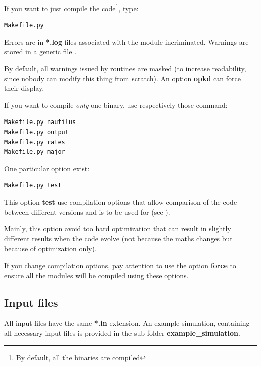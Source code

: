 \documentclass[english,a4paper,twoside]{article}
\begin{document}
If you want to just compile the code\footnote{By default, all the binaries are compiled}, type:
\begin{verbatim}
Makefile.py
\end{verbatim}

\begin{remarque}
Errors are in \textbf{*.log} files associated with the module incriminated. Warnings are stored in a generic file .
\end{remarque}

\begin{attention}
By default, all warnings issued by  routines are masked (to increase readability, since nobody can modify this thing from scratch). An option \textbf{opkd} can force their display.
\end{attention}

If you want to compile \emph{only} one binary, use respectively those command:
\begin{verbatim}
Makefile.py nautilus
Makefile.py output
Makefile.py rates
Makefile.py major
\end{verbatim}

\bigskip

One particular option exist:
\begin{verbatim}
Makefile.py test
\end{verbatim}
This option \textbf{test} use compilation options that allow comparison of the code between different versions and is to be used for  (see ). 

\begin{remarque}
Mainly, this option avoid too hard optimization that can result in slightly different results when the code evolve (not because the maths changes but because of optimization only).
\end{remarque}

\begin{attention}
If you change compilation options, pay attention to use the option \textbf{force} to ensure all the modules will be compiled using these options.
\end{attention}

\subsection{Input files}\label{sec:input-files}
All input files have the same \textbf{*.in} extension. An example simulation, containing all necessary input files is provided in the sub-folder \textbf{example\_simulation}.
\end{document}
